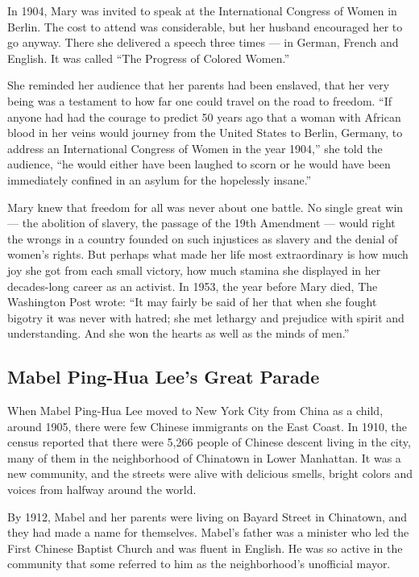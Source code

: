 In 1904, Mary was invited to speak at the International Congress of
Women in Berlin. The cost to attend was considerable, but her husband
encouraged her to go anyway. There she delivered a speech three times
--- in German, French and English. It was called ``The Progress of
Colored Women.''

She reminded her audience that her parents had been enslaved, that her
very being was a testament to how far one could travel on the road to
freedom. ``If anyone had had the courage to predict 50 years ago that a
woman with African blood in her veins would journey from the United
States to Berlin, Germany, to address an International Congress of Women
in the year 1904,'' she told the audience, ``he would either have been
laughed to scorn or he would have been immediately confined in an asylum
for the hopelessly insane.''

Mary knew that freedom for all was never about one battle. No single
great win --- the abolition of slavery, the passage of the 19th
Amendment --- would right the wrongs in a country founded on such
injustices as slavery and the denial of women's rights. But perhaps what
made her life most extraordinary is how much joy she got from each small
victory, how much stamina she displayed in her decades-long career as an
activist. In 1953, the year before Mary died, The Washington Post wrote:
``It may fairly be said of her that when she fought bigotry it was never
with hatred; she met lethargy and prejudice with spirit and
understanding. And she won the hearts as well as the minds of men.''

\hypertarget{mabel-ping-hua-lees-great-parade}{%
\subsection{Mabel Ping-Hua Lee's Great
Parade}\label{mabel-ping-hua-lees-great-parade}}

When Mabel Ping-Hua Lee moved to New York City from China as a child,
around 1905, there were few Chinese immigrants on the East Coast. In
1910, the census reported that there were 5,266 people of Chinese
descent living in the city, many of them in the neighborhood of
Chinatown in Lower Manhattan. It was a new community, and the streets
were alive with delicious smells, bright colors and voices from halfway
around the world.

By 1912, Mabel and her parents were living on Bayard Street in
Chinatown, and they had made a name for themselves. Mabel's father was a
minister who led the First Chinese Baptist Church and was fluent in
English. He was so active in the community that some referred to him as
the neighborhood's unofficial mayor.

